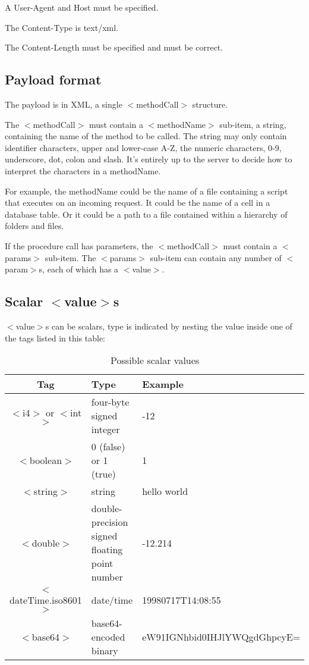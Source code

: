 A User-Agent and Host must be specified.

The Content-Type is text/xml.

The Content-Length must be specified and must be correct.

\subsection{Payload format}

The payload is in XML, a single $<$methodCall$>$ structure.

The $<$methodCall$>$ must contain a $<$methodName$>$ sub-item, a string, containing the name of the method to be called. The string may only contain identifier characters, upper and lower-case A-Z, the numeric characters, 0-9, underscore, dot, colon and slash. It's entirely up to the server to decide how to interpret the characters in a methodName.

For example, the methodName could be the name of a file containing a script that executes on an incoming request. It could be the name of a cell in a database table. Or it could be a path to a file contained within a hierarchy of folders and files.

If the procedure call has parameters, the $<$methodCall$>$ must contain a $<$params$>$ sub-item. The $<$params$>$ sub-item can contain any number of $<$param$>$s, each of which has a $<$value$>$.

\subsection{Scalar $<$value$>$s}

$<$value$>$s can be scalars, type is indicated by nesting the value inside one of the tags listed in this table:

\begin{table}
\begin{tabular}{| c | p{4cm} | p{6cm} |}
\hline
Tag & Type & Example \\
\hline
$<$i4$>$ or $<$int$>$ & four-byte signed integer & -12 \\
$<$boolean$>$ & 0 (false) or 1 (true) & 1 \\
$<$string$>$ & string & hello world \\
$<$double$>$ & double-precision signed floating point number & -12.214 \\
$<$dateTime.iso8601$>$ & date/time & 19980717T14:08:55 \\
$<$base64$>$ & base64-encoded binary & eW91IGNhbid0IHJlYWQgdGhpcyE= \\
\hline
\end{tabular}
\caption{Possible scalar values}
\end{table}

